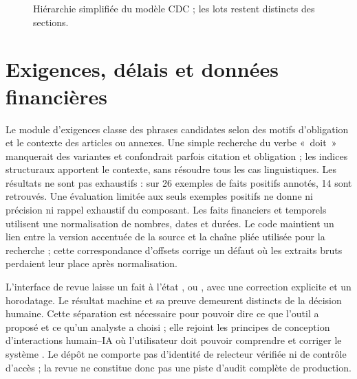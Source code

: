\begin{figure}[htbp]\centering
{}
\caption{Hiérarchie simplifiée du modèle CDC ; les lots restent distincts des sections.}\label{fig:hierarchie}
\end{figure}

\section{Exigences, délais et données financières}
Le module d'exigences classe des phrases candidates selon des motifs d'obligation et le contexte des articles ou annexes. Une simple recherche du verbe «~doit~» manquerait des variantes et confondrait parfois citation et obligation ; les indices structuraux apportent le contexte, sans résoudre tous les cas linguistiques. Les résultats ne sont pas exhaustifs : sur 26 exemples de faits positifs annotés, 14 sont retrouvés. Une évaluation limitée aux seuls exemples positifs ne donne ni précision ni rappel exhaustif du composant. Les faits financiers et temporels utilisent une normalisation de nombres, dates et durées. Le code maintient un lien entre la version accentuée de la source et la chaîne pliée utilisée pour la recherche ; cette correspondance d'offsets corrige un défaut où les extraits bruts perdaient leur place après normalisation.

L'interface de revue laisse un fait à l'état \texttt{}, \texttt{} ou \texttt{}, avec une correction explicite et un horodatage. Le résultat machine et sa preuve demeurent distincts de la décision humaine. Cette séparation est nécessaire pour pouvoir dire ce que l'outil a proposé et ce qu'un analyste a choisi ; elle rejoint les principes de conception d'interactions humain--IA où l'utilisateur doit pouvoir comprendre et corriger le système \cite{amershi}. Le dépôt ne comporte pas d'identité de relecteur vérifiée ni de contrôle d'accès ; la revue ne constitue donc pas une piste d'audit complète de production.

